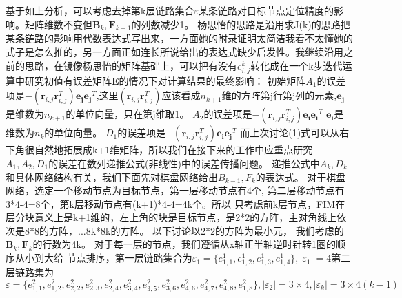 \documentclass[12pt]{article}
\begin{document}
基于如上分析，可以考虑去掉第k层链路集合$\varepsilon$某条链路对目标节点定位精度的影响。矩阵维数不变但$\bm{B}_k,\bm{F}_{k+1}$的列数减少1。
杨思怡的思路是沿用求J(k)的思路把某条链路的影响用代数表达式写出来，一方面她的附录证明太简洁我看不太懂她的式子是怎么推的，另一方面正如连长所说给出的表达式缺少启发性。我继续沿用之前的思路，在镜像杨思怡的矩阵基础上，可以把有没有$e^k_{i,j}$转化成在一个k步迭代运算中研究初值有误差矩阵$\bm{E}$的情况下对计算结果的最终影响：
初始矩阵$A_1$的误差项是$-(\bm{r}_{i,j}\bm{r}_{i,j}^T)\bm{e_j}\bm{e_j}^T$,这里$(\bm{r}_{i,j}\bm{r}_{i,j}^T)$应该看成$n_{k+1}$维的方阵第j行第j列的元素,$\bm{e_j}$是维数为$n_{k+1}$的单位向量，只在第j维取1。
$A_2$的误差项是$-(\bm{r}_{i,j}\bm{r}_{i,j}^T)\bm{e_i}\bm{e_i}^T$
$\bm{e_i}$是维数为$n_{k}$的单位向量。
$D_1$的误差项是$-(\bm{r}_{i,j}\bm{r}_{i,j}^T)\bm{e_i}\bm{e_j}^T$
而上次讨论(1)式可以从右下角很自然地拓展成k+1维矩阵，所以我们在接下来的工作中应重点研究$A_1,A_2,D_1$的误差在数列递推公式(非线性)中的误差传播问题。
递推公式中$A_k,D_k$和具体网络结构有关，我们下面先对棋盘网络给出$B_{k-1},
F_k$的表达式。
对于棋盘网络，选定一个移动节点为目标节点，第一层移动节点有4个,
第二层移动节点有3*4-4=8个，第k层移动节点有(k+1)*4-4=4k个。所以
只考虑前k层节点，FIM在层分块意义上是k+1维的，左上角的块是目标节点，是2*2的方阵，主对角线上依次是8*8的方阵，...8k*8k的方阵。
以下讨论以2*2的方阵为最小元，
我们考虑的$\bm{B}_{k},\bm{F}_{k}$的行数为4k。
对于每一层的节点，我们遵循从x轴正半轴逆时针转1圈的顺序从小到大给
节点排序，第一层链路集合为$\varepsilon_1=\{e^1_{1,1},e^1_{1,2},e^1_{1,3},e^1_{1,4}\},|\varepsilon_1|=4$第二层链路集为
$\varepsilon=\{e^2_{1,1},e^2_{1,2},e^2_{2,2},
e^2_{2,3},e^2_{2,4},e^2_{3,4},e^2_{3,5},
e^2_{3,6},e^2_{4,6},e^2_{4,7},e^2_{4,8},e^2_{1,8}\},|\varepsilon_2|=3\times 4,|\varepsilon_k|=3\times 4(k-1)$
\end{document}
